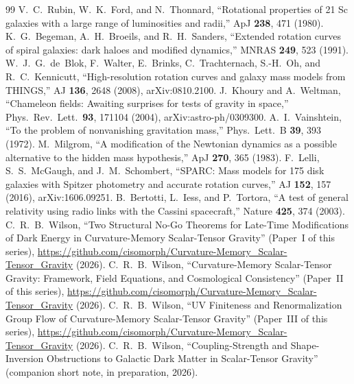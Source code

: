 \documentclass[12pt,a4paper]{article}
\theoremstyle{plain}
\begin{document}
\begin{thebibliography}{99}
  V.~C.~Rubin, W.~K.~Ford, and N.~Thonnard,
  ``Rotational properties of 21 Sc galaxies with a large range of luminosities
    and radii,''
  ApJ \textbf{238}, 471 (1980).
  K.~G.~Begeman, A.~H.~Broeils, and R.~H.~Sanders,
  ``Extended rotation curves of spiral galaxies: dark haloes and modified
    dynamics,''
  MNRAS \textbf{249}, 523 (1991).
  W.~J.~G.~de~Blok, F.~Walter, E.~Brinks, C.~Trachternach, S.-H.~Oh, and
  R.~C.~Kennicutt,
  ``High-resolution rotation curves and galaxy mass models from THINGS,''
  AJ \textbf{136}, 2648 (2008), arXiv:0810.2100.
  J.~Khoury and A.~Weltman,
  ``Chameleon fields: Awaiting surprises for tests of gravity in space,''
  Phys.\ Rev.\ Lett.\ \textbf{93}, 171104 (2004), arXiv:astro-ph/0309300.
  A.~I.~Vainshtein,
  ``To the problem of nonvanishing gravitation mass,''
  Phys.\ Lett.\ B \textbf{39}, 393 (1972).
  M.~Milgrom,
  ``A modification of the Newtonian dynamics as a possible alternative to the
    hidden mass hypothesis,''
  ApJ \textbf{270}, 365 (1983).
  F.~Lelli, S.~S.~McGaugh, and J.~M.~Schombert,
  ``SPARC: Mass models for 175 disk galaxies with Spitzer photometry and
    accurate rotation curves,''
  AJ \textbf{152}, 157 (2016), arXiv:1606.09251.
  B.~Bertotti, L.~Iess, and P.~Tortora,
  ``A test of general relativity using radio links with the Cassini spacecraft,''
  Nature \textbf{425}, 374 (2003).
  C.~R.~B.~Wilson,
  ``Two Structural No-Go Theorems for Late-Time Modifications of Dark Energy
    in Curvature-Memory Scalar-Tensor Gravity''
  (Paper~I of this series), \url{https://github.com/cisomorph/Curvature-Memory_Scalar-Tensor_Gravity} (2026).
  C.~R.~B.~Wilson,
  ``Curvature-Memory Scalar-Tensor Gravity: Framework, Field Equations, and Cosmological Consistency''
  (Paper~II of this series), \url{https://github.com/cisomorph/Curvature-Memory_Scalar-Tensor_Gravity} (2026).
  C.~R.~B.~Wilson,
  ``UV Finiteness and Renormalization Group Flow of Curvature-Memory Scalar-Tensor Gravity''
  (Paper~III of this series), \url{https://github.com/cisomorph/Curvature-Memory_Scalar-Tensor_Gravity} (2026).
  C.~R.~B.~Wilson,
  ``Coupling-Strength and Shape-Inversion Obstructions to Galactic Dark Matter in
    Scalar-Tensor Gravity''
  (companion short note, in preparation, 2026).
\end{thebibliography}
\end{document}
